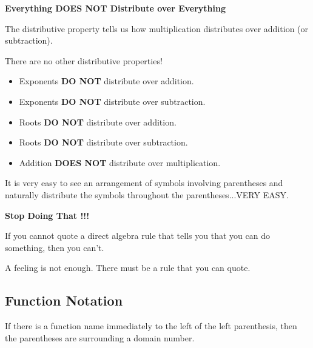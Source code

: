\documentclass{ximera}
\begin{document}
\begin{warning} \textbf{\textcolor{red!70!black}{Everything DOES NOT Distribute over Everything}}

The distributive property tells us how multiplication distributes over addition (or subtraction). 


There are no other distributive properties! 

\begin{itemize}
    \item Exponents \textbf{\textcolor{red!70!black}{DO NOT}} distribute over addition.
    \item Exponents \textbf{\textcolor{red!70!black}{DO NOT}} distribute over subtraction.
    \item Roots \textbf{\textcolor{red!70!black}{DO NOT}} distribute over addition.
    \item Roots \textbf{\textcolor{red!70!black}{DO NOT}} distribute over subtraction.
    \item Addition \textbf{\textcolor{red!70!black}{DOES NOT}} distribute over multiplication.
\end{itemize}


It is very easy to see an arrangement of symbols involving parentheses and naturally distribute the symbols throughout the parentheses...VERY EASY. 

\begin{center}

\textbf{\textcolor{red!70!black}{Stop Doing That !!!}}

\end{center}



If you cannot quote a direct algebra rule that tells you that you can do something, then you can't.  

A feeling is not enough.  There must be a rule that you can quote.


\end{warning}














\subsection*{Function Notation}


If there is a function name immediately to the left of the left parenthesis, then the parentheses are surrounding a domain number.   
\end{document}
